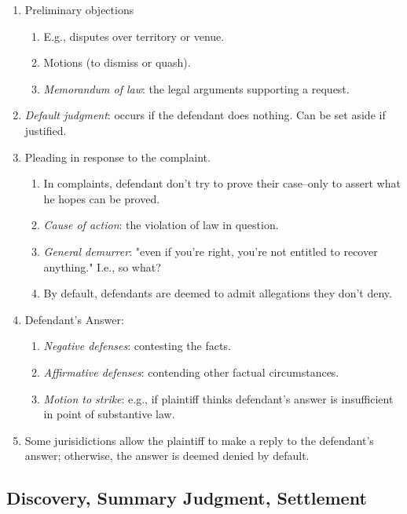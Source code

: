 \begin{enumerate}
    \item Preliminary objections
    \begin{enumerate}
        \item E.g., disputes over territory or venue.
        \item Motions (to dismiss or quash).
        \item \emph{Memorandum of law}: the legal arguments supporting a request.
    \end{enumerate}
    \item \emph{Default judgment}: occurs if the defendant does nothing. Can be set aside if justified.
    \item Pleading in response to the complaint.
    \begin{enumerate}
        \item In complaints, defendant don't try to prove their case--only to assert what he hopes can be proved.
        \item \emph{Cause of action}: the violation of law in question.
        \item \emph{General demurrer}: "even if you're right, you're not entitled to recover anything." I.e., so what?
        \item By default, defendants are deemed to admit allegations they don't deny.
    \end{enumerate}
    \item Defendant's Answer:
    \begin{enumerate}
        \item \emph{Negative defenses}: contesting the facts.
        \item \emph{Affirmative defenses}: contending other factual circumstances.
        \item \emph{Motion to strike}: e.g., if plaintiff thinks defendant's answer is insufficient in point of substantive law.
    \end{enumerate}
    \item Some jurisidictions allow the plaintiff to make a reply to the defendant's answer; otherwise, the answer is deemed denied by default.
\end{enumerate}

\subsection{Discovery, Summary Judgment, Settlement}


